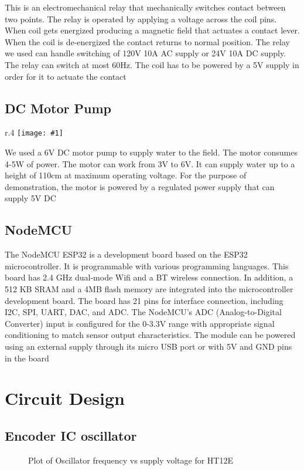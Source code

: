\documentclass[12pt, a4paper]{report}
\newcommand{\addsvg}[2]{}
\newcommand{\addimg}[2]{\texttt{[image: \#1]}}
\newcommand{\floatfig}[6]{
  \begin{wrapfigure}{#1}{#2\textwidth}
    \centering
    \addimg{images/#3}{#4\linewidth}
    \caption{\centering #5}
    \vspace*{#6}
  \end{wrapfigure}
}
\begin{document}
This is an electromechanical relay that mechanically switches contact
between two points. The relay is operated by applying a voltage
across the coil pins. When coil gets energized producing a magnetic
field that actuates a contact lever. When the coil is de-energized
the contact returns to normal position. The relay we used can handle
switching of 120V 10A AC supply or 24V 10A DC supply. The relay can
switch at most 60Hz. The coil has to be powered by a 5V supply in
order for it to actuate the contact

\section{DC Motor Pump}

\floatfig{r}{.4}{pump.png}{.6}{DC motor pump}{-1cm}

We used a 6V DC motor pump to supply water to the field. The motor
consumes 4-5W of power. The motor can work from 3V to 6V. It can
supply water up to a height of 110cm at maximum operating voltage.
For the purpose of demonstration, the motor is powered by a regulated
power supply that can supply 5V DC

\vspace*{1cm}

\section{NodeMCU}
The NodeMCU ESP32 is a development board based on the ESP32
microcontroller. It is programmable with various programming
languages. This board has 2.4 GHz dual-mode Wifi and a BT wireless
connection. In addition, a 512 KB SRAM and a 4MB flash memory are
integrated into the microcontroller development board. The board has
21 pins for interface connection, including I2C, SPI, UART, DAC, and
ADC. The NodeMCU's ADC (Analog-to-Digital Converter) input is
configured for the 0-3.3V range with appropriate signal conditioning
to match sensor output characteristics.  The module can be powered
using an external supply through its micro USB port or with 5V and
GND pins in the board

\newpage
\chapter{Circuit Design}
\section{Encoder IC oscillator}
\begin{figure}[ht]
	\centering
	\addsvg{images/enc-osc.svg}{.8\linewidth}
	\caption{Plot of Oscillator frequency vs supply voltage for HT12E}
  \end{figure}
\end{document}
